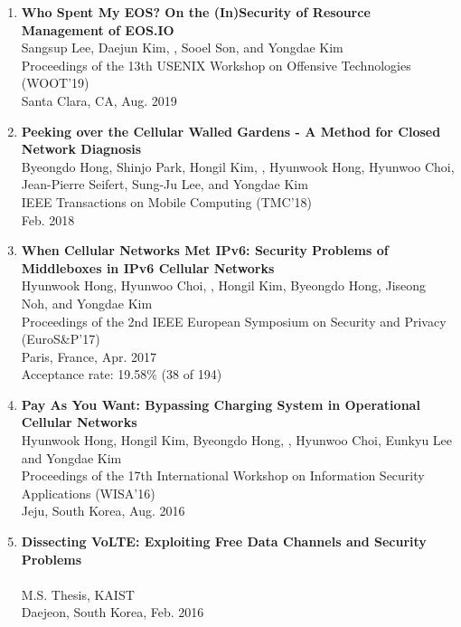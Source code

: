 \begin{enumerate}[leftmargin=1.5em]
    \item \textbf{Who Spent My EOS? On the (In)Security of Resource Management of EOS.IO} \\
        {\small
            Sangsup Lee, Daejun Kim, , Sooel Son, and Yongdae Kim \\
            Proceedings of the 13th USENIX Workshop on Offensive Technologies (WOOT'19) \\
            Santa Clara, CA, Aug. 2019
        }

    \item \textbf{Peeking over the Cellular Walled Gardens - A Method for Closed Network Diagnosis} \\
        {\small
            Byeongdo Hong, Shinjo Park, Hongil Kim, , Hyunwook Hong, Hyunwoo Choi, Jean-Pierre Seifert, Sung-Ju Lee, and Yongdae Kim \\
            IEEE Transactions on Mobile Computing (TMC'18) \\
            Feb. 2018
        }

    \item \textbf{When Cellular Networks Met IPv6: Security Problems of Middleboxes in IPv6 Cellular Networks} \\
        {\small
            Hyunwook Hong, Hyunwoo Choi, , Hongil Kim, Byeongdo Hong, Jiseong Noh, and Yongdae Kim \\
            Proceedings of the 2nd IEEE European Symposium on Security and Privacy (EuroS\&P'17)\\
            Paris, France, Apr. 2017 \\
            Acceptance rate: 19.58\% (38 of 194)
        }

    \item \textbf{Pay As You Want: Bypassing Charging System in Operational Cellular Networks} \\
        {\small
            Hyunwook Hong, Hongil Kim, Byeongdo Hong, , Hyunwoo Choi, Eunkyu Lee and Yongdae Kim \\
            Proceedings of the 17th International Workshop on Information Security Applications (WISA'16)\\
            Jeju, South Korea, Aug. 2016
        }

    \item \textbf{Dissecting VoLTE: Exploiting Free Data Channels and Security Problems} \\
        {\small
             \\
            M.S. Thesis, KAIST \\
            Daejeon, South Korea, Feb. 2016
        }


\end{enumerate}
